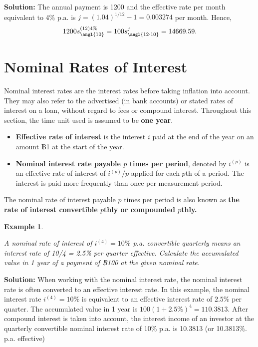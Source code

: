 \documentclass[landscape, 20pt]{extreport}
\theoremstyle{definition}
\theoremstyle{definition}
\newtheorem{example}{Example}[chapter]
\theoremstyle{definition}
\theoremstyle{definition}
\theoremstyle{remark}
\begin{document}
\textbf{Solution:} The annual payment is 1200 and the effective rate per
month equivalent to 4\% p.a. is \(j = (1.04)^{1/12} - 1 = 0.003274\) per
month. Hence,
\[1200 s^{(12)4\%}_\angl{10}   = 100  s^j_\angl{12\cdot 10} = 14669.59.\]

\hypertarget{nominal-rates-of-interest}{%
\section{Nominal Rates of Interest}\label{nominal-rates-of-interest}}

Nominal interest rates are the interest rates before taking inflation
into account. They may also refer to the advertised (in bank accounts)
or stated rates of interest on a loan, without regard to fees or
compound interest. Throughout this section, the time unit used is
assumed to be \textbf{one year}.

\begin{itemize}
\item
  \textbf{Effective rate of interest} is the interest \(i\) paid at the end
  of the year on an amount ฿1 at the start of the year.
\item
  \textbf{Nominal interest rate payable \(p\) times per period}, denoted by
  \(i^{(p)}\) is an effective rate of interest of \(i^{(p)}/p\) applied
  for each \(p\)th of a period. The interest is paid more frequently
  than once per measurement period.
\end{itemize}

The nominal rate of interest payable \(p\) times per period is also known
as \textbf{the rate of interest convertible \(p\)thly or compounded \(p\)thly.}

\newpage \begin{example}
\protect\hypertarget{exm:unlabeled-div-31}{}\label{exm:unlabeled-div-31}

\emph{A nominal rate of interest of \(i^{(4)} = 10\%\) p.a.
convertible quarterly means an interest rate of 10/4 = 2.5\% per quarter
effective. Calculate the accumulated value in 1 year of a payment of
฿100 at the given nominal rate.}

\end{example}

\textbf{Solution:} When working with the nominal interest rate, the nominal
interest rate is often converted to an effective interest rate. In this
example, the nominal interest rate \(i^{(4)} = 10\%\) is equivalent to an
effective interest rate of \(2.5\%\) per quarter. The accumulated value in
1 year is \(100 (1 + 2.5\%)^4 = 110.3813\). After compound interest is
taken into account, the interest income of an investor at the quarterly
convertible nominal interest rate of 10\% p.a. is 10.3813 (or 10.3813\%.
p.a. effective)
\end{document}
